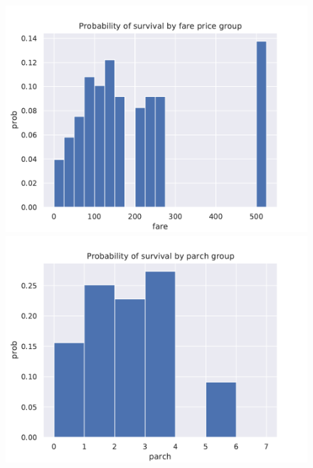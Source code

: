 \documentclass{book}
\begin{document}
\begin{figure}
    \centering
    \includegraphics[scale=.75]{../figs/prob_hist_fare.pdf}
    \includegraphics[scale=.75]{../figs/prob_hist_parch.pdf}
\end{figure}

\clearpage
\end{document}
